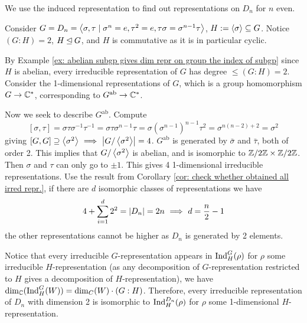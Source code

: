 \documentclass{article}
\begin{document}
\begin{example}[Representations of $D_n$]
    We use the induced representation to find out representations on $D_n$ for $n$ even.

    Consider $G = D_n = \left\langle  \sigma, \tau \mid \sigma^n = e, \tau^2 = e, \tau \sigma = \sigma^{n-1} \tau  \right\rangle$, $H := \left\langle \sigma \right\rangle \subseteq G$. Notice $(G : H) = 2$, $H \unlhd G$, and $H$ is commutative as it is in particular cyclic. 

    By Example \ref{ex: abelian subgp gives dim repr on group the index of subgp} since $H$ is abelian, every irreducible representation of $G$ has degree $\leq (G : H) = 2$. Consider the 1-dimensional representations of $G$, which is a group homomorphism $G \to \mathbb{C}^{\ast}$, corresponding to $G^{\text{ab}} \to \mathbb{C}^{\ast}$.

    Now we seek to describe $G^{\text{ab}}$. Compute
    \[
        [\sigma, \tau] = \sigma \tau \sigma^{-1} \tau^{-1} = \sigma \tau \sigma^{n-1} \tau = \sigma (\sigma^{n-1})^{n-1} \tau^2 = \sigma^{n(n-2) + 2} = \sigma^2
    \]
    giving $[G, G] \supseteq \left\langle \sigma^2 \right\rangle \ \Longrightarrow\  \left|G/\left\langle \sigma^2 \right\rangle\right| = 4$. $G^{\text{ab}}$ is generated by $\bar{\sigma}$ and $\bar{\tau}$, both of order 2. This implies that $G/\left\langle \sigma^2 \right\rangle$ is abelian, and is isomorphic to $\mathbb{Z}/2\mathbb{Z} \times \mathbb{Z}/2\mathbb{Z}$. Then $\sigma$ and $\tau$ can only go to $\pm 1$. This gives 4 1-dimensional irreducible representations. Use the result from Corollary \ref{cor: check whether obtained all irred repr.}, if there are $d$ isomorphic classes of representations we have
    \[
        4 + \sum_{i = 1}^d 2^2 = \left|D_n\right| = 2n \ \Longrightarrow\  d = \frac{n}{2} - 1
    \]
    the other representations cannot be higher as $D_n$ is generated by 2 elements.

    Notice that every irreducible $G$-representation appears in $\mathrm{Ind}_H^G(\rho)$ for $\rho$ some irreducible $H$-representation (as any decomposition of $G$-representation restricted to $H$ gives a decomposition of $H$-representation), we have $\dim_{\mathbb{C}} (\mathrm{Ind}_H^G(W)) = \dim_C(W) \cdot (G : H)$. Therefore, every irreducible representation of $D_n$ with dimension 2 is isomorphic to $\mathrm{Ind}_H^{D_n}(\rho)$ for $\rho$ some 1-dimensional $H$-representation.


\end{example}
\end{document}
